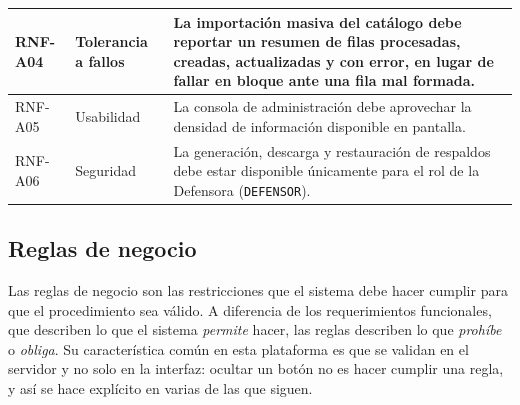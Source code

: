 \begin{longtable}{|p{1.7cm}|p{2.7cm}|p{9.7cm}|}
		RNF-A04 & Tolerancia a fallos & La importación masiva del catálogo debe reportar un resumen
		de filas procesadas, creadas, actualizadas y con error, en lugar de fallar en bloque ante una
		fila mal formada. \\ \hline
	
		RNF-A05 & Usabilidad & La consola de administración debe aprovechar la densidad de
		información disponible en pantalla. \\ \hline
	
		RNF-A06 & Seguridad & La generación, descarga y restauración de respaldos debe estar
		disponible únicamente para el rol de la Defensora (\texttt{DEFENSOR}). \\ \hline
	\end{longtable}
	
	\normalsize
	
	\subsection{Reglas de negocio}
	Las reglas de negocio son las restricciones que el sistema debe hacer cumplir para que el
	procedimiento sea válido. A diferencia de los requerimientos funcionales, que describen lo que
	el sistema \emph{permite} hacer, las reglas describen lo que \emph{prohíbe} o \emph{obliga}. Su
	característica común en esta plataforma es que se validan en el servidor y no solo en la
	interfaz: ocultar un botón no es hacer cumplir una regla, y así se hace explícito en varias de
	las que siguen.
	
	\small
	\renewcommand{\arraystretch}{1.2}
	
